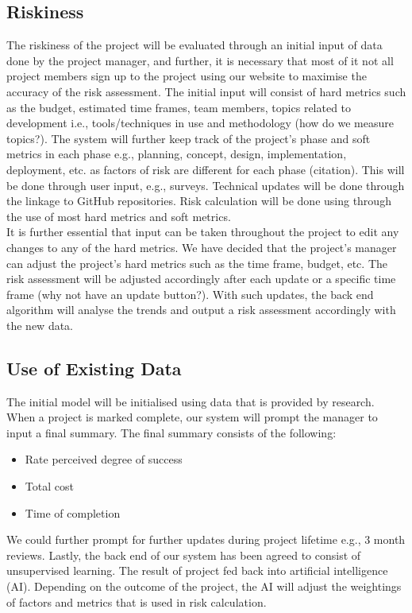 \documentclass[a4paper]{article}
\theoremstyle{plain}
\theoremstyle{definition}
\theoremstyle{remark}
\begin{document}
\subsection{Riskiness}
The riskiness of the project will be evaluated through an initial input of data done by the project manager, and further, it is necessary that most of it not all project members sign up to the project using our website to maximise the accuracy of the risk assessment. The initial input will consist of hard metrics such as the budget, estimated time frames, team members, topics related to development i.e., tools/techniques in use and methodology (how do we measure topics?). The system will further keep track of the project's phase and soft metrics in each phase e.g., planning, concept, design, implementation, deployment, etc. as factors of risk are different for each phase (citation). This will be done through user input, e.g., surveys. Technical updates will be done through the linkage to GitHub repositories. Risk calculation will be done using through the use of most hard metrics and soft metrics.\\

\noindent It is further essential that input can be taken throughout the project to edit any changes to any of the hard metrics. We have decided that the project's manager can adjust the project's hard metrics such as the time frame, budget, etc. The risk assessment will be adjusted accordingly after each update or a specific time frame (why not have an update button?). With such updates, the back end algorithm will analyse the trends and output a risk assessment accordingly with the new data.

\subsection{Use of Existing Data}
The initial model will be initialised using data that is provided by research. When a project is marked complete, our system will prompt the manager to input a final summary. The final summary consists of the following:
\begin{itemize}
	\item Rate perceived degree of success
	\item Total cost
	\item Time of completion
\end{itemize}
We could further prompt for further updates during project lifetime e.g., 3 month reviews. Lastly, the back end of our system has been agreed to consist of unsupervised learning. The result of project fed back into artificial intelligence (AI). Depending on the outcome of the project, the AI will adjust the weightings of factors and metrics that is used in risk calculation. \\
\end{document}
